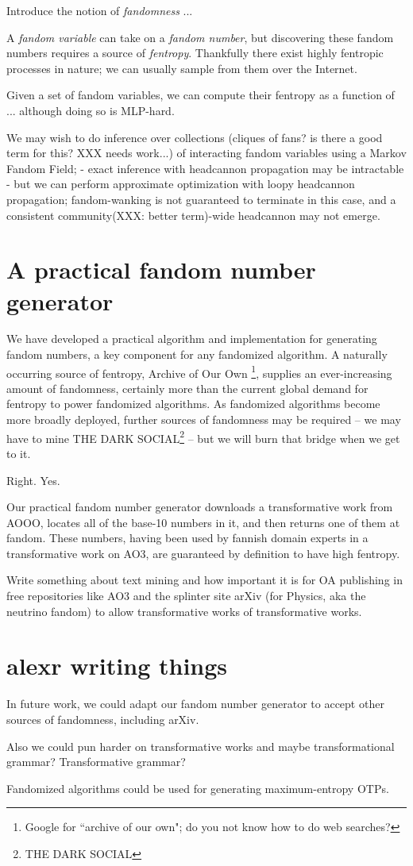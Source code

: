 \documentclass[11pt,twocolumn]{article}
\begin{document}
Introduce the notion of \emph{fandomness} ...

A \emph{fandom variable} can take on a \emph{fandom number}, but discovering
these fandom numbers requires a source of \emph{fentropy}. Thankfully there
exist highly fentropic processes in nature; we can usually sample from them
over the Internet.

Given a set of fandom variables, we can compute their fentropy as a function of
... although doing so is MLP-hard.

We may wish to do inference over collections (cliques of fans? is there a good
term for this? XXX needs work...) of interacting fandom variables using a
Markov Fandom Field; 
- exact inference with headcannon propagation may be intractable
- but we can perform approximate optimization with loopy headcannon
  propagation; fandom-wanking is not guaranteed to terminate in this case, and
  a consistent community(XXX: better term)-wide headcannon may not emerge.

\section{A practical fandom number generator}
We have developed a practical algorithm and implementation for generating
fandom numbers, a key component for any fandomized algorithm. A naturally
occurring source of fentropy, Archive of Our Own \footnote{Google for ``archive
of our own"; do you not know how to do web searches?}, supplies an
ever-increasing amount of fandomness, certainly more than the current global
demand for fentropy to power fandomized algorithms. As fandomized algorithms
become more broadly deployed, further sources of fandomness may be required --
we may have to mine THE DARK SOCIAL\footnote{THE DARK SOCIAL} -- but we will
burn that bridge when we get to it.

Right. Yes.

Our practical fandom number generator downloads a transformative work from
AOOO, locates all of the base-10 numbers in it, and then returns one of them at
fandom. These numbers, having been used by fannish domain experts in a
transformative work on AO3, are guaranteed by definition to have high fentropy.

Write something about text mining and how important it is for OA publishing in
free repositories like AO3 and the splinter site arXiv (for Physics, aka the
neutrino fandom) to allow transformative works of transformative works.  

\section{alexr writing things}
In future work, we could adapt our fandom number generator to accept other
sources of fandomness, including arXiv.

Also we could pun harder on transformative works and maybe transformational
grammar? Transformative grammar?

Fandomized algorithms could be used for generating maximum-entropy OTPs.


{}
\end{document}
